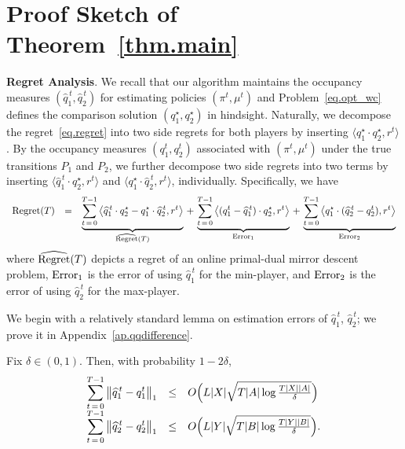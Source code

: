 \documentclass[12pt, final]{l4dc2023}
\begin{document}
\section{Proof Sketch of Theorem~\ref{thm.main}}
\label{proof}

\noindent\textbf{Regret Analysis}. 
We recall that our algorithm maintains the occupancy measures $(\hat q_1^{\,t}, \hat q_2^{\,t})$ for estimating policies $(\pi^t,\mu^t)$ and Problem~\eqref{eq.opt_wc} defines the comparison solution $(q_1^\star,q_2^\star)$ in hindsight. Naturally, we decompose the regret~\eqref{eq.regret} into two side regrets for both players by inserting $\langle q_1^\star\cdot q_2^\star,r^t\rangle $. By the occupancy measures $(q_1^t, q_2^t)$ associated with $(\pi^t,\mu^t)$ under the true transitions $P_1$ and $P_2$, we further decompose two side regrets into two terms by inserting $\langle \hat q_1^{\,t}\cdot  q_2^\star,r^{t}\rangle$ and $\langle q_1^\star\cdot \hat q_2^{\,t},r^{t}\rangle$, individually. Specifically, we have
\[
\begin{array}{rcl}
\text{Regret}(T) 
&=&\displaystyle 
\underbrace{
	\sum_{t\,=\,0}^{T-1} \big\langle{ \hat q_1^{\,t}\cdot  q_2^\star- q_1^\star\cdot \hat q_2^{\,t} },{r^{t}}\big\rangle 
}_{\hat{\text{\normalfont Regret}}(T)}
\,+\,
\underbrace{
	\sum_{t\,=\,0}^{T-1} \inner{( q_1^t-\hat q_1^{\,t}) \cdot q_2^\star}{r^t} 
}_{\text{\normalfont Error}_1}
\,+\,
\underbrace{
	\sum_{t\,=\,0}^{T-1} \inner{q_1^\star \cdot (\hat q_2^{\,t}-q_2^t)}{r^t} 
}_{\text{\normalfont Error}_2}
\end{array}
\]
where ${\hat{\text{\normalfont Regret}}(T)}$ depicts a regret of an online primal-dual mirror descent problem, ${\text{\normalfont Error}_1}$ is the error of using $\hat q_1^{\,t}$ for the min-player, and ${\text{\normalfont Error}_2}$ is the error of using $\hat q_2^{\,t}$ for the max-player.

We begin with a relatively standard lemma on estimation errors of $\hat q_1^{\,t}$, $\hat q_2^{\,t}$; we prove it in Appendix~\ref{ap.qqdifference}. 

\begin{lemma}\label{lem.qqdifference}
	Fix $\delta\in(0,1)$. Then, with probability $1-2\delta$,
	\[
	\begin{array}{rcl}
	\displaystyle\sum_{t\,=\,0}^{T-1} \norm{\hat q_1^{\,t}-q_1^t}_1
	&\leq& O \Big( L|X|\sqrt{T |A| \log \tfrac{T|X||A|}{\delta}}\Big)
	\\[0.2cm]
	\displaystyle\sum_{t\,=\,0}^{T-1} \norm{\hat q_2^{\,t}-q_2^t}_1
	&\leq& O\Big( L|Y|\sqrt{T |B| \log\tfrac{T|Y||B|}{\delta}}\Big).
	\end{array}
	\]
\end{lemma}
\vspace*{-0.2cm}
\end{document}

